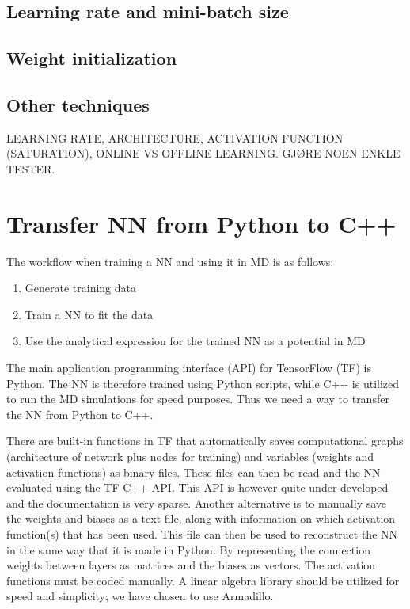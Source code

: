 \documentclass[twoside,english]{uiofysmaster}
\begin{document}
\subsection{Learning rate and mini-batch size}


\subsection{Weight initialization}

\subsection{Other techniques}











LEARNING RATE, ARCHITECTURE, ACTIVATION FUNCTION (SATURATION), ONLINE VS OFFLINE LEARNING. 
GJØRE NOEN ENKLE TESTER. 

\section{Transfer NN from Python to C++} \label{sec:timeUsage}
The workflow when training a NN and using it in MD is as follows: 
\begin{enumerate}
 \item Generate training data
 \item Train a NN to fit the data
 \item Use the analytical expression for the trained NN as a potential in MD
\end{enumerate}
The main application programming interface (API) for TensorFlow (TF) is Python. The NN is therefore
trained using Python scripts, while C++ is utilized to run the MD simulations for speed purposes. Thus
we need a way to transfer the NN from Python to C++. 

There are built-in functions in TF that automatically saves computational graphs (architecture of network plus
nodes for training) and variables (weights and activation functions) as binary files.
These files can then be read and the NN evaluated using the TF C++ API. This API is however quite under-developed
and the documentation is very sparse. Another alternative is to manually save the weights and biases
as a text file, along with information on which activation function(s) that has been used. This file 
can then be used to reconstruct the NN in the same way that it is made in Python: By representing
the connection weights between layers as matrices and the biases as vectors. The activation functions
must be coded manually. A linear algebra library should
be utilized for speed and simplicity; we have chosen to use Armadillo. 
\end{document}
